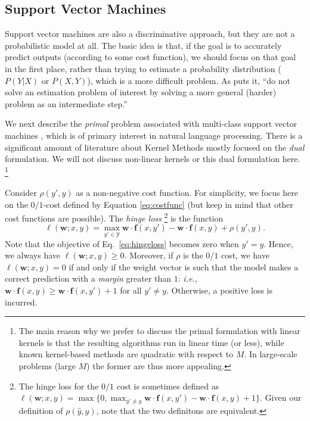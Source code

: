 \subsection{Support Vector Machines}\label{sec:svms}

Support vector machines are also a discriminative approach, but they are not a probabilistic model at all. 
The basic idea is that, if the goal is to accurately predict outputs (according to some cost function), we should focus on that 
goal in the first place, rather than trying to estimate a probability distribution ($P(Y|X)$ or $P(X,Y)$), 
which is a more difficult problem. As \citet{Vapnik1995} puts it, 
``do not solve an estimation problem of interest by solving a more general (harder) problem as an intermediate step.''  

We next describe the \emph{primal} problem associated with multi-class support vector machines \citep{Crammer2002}, 
which is of primary interest in natural language processing. 
There is a significant amount of literature about Kernel Methods \citep{Schoelkopf2002,ShaweTaylor2004} mostly focused 
on the \emph{dual} formulation. We will not discuss non-linear kernels or this dual formulation here.%
\footnote{The main reason why we prefer to discuss the primal formulation with linear kernels is that 
the resulting algorithms run in linear time (or less), while known kernel-based methods are quadratic with 
respect to $M$. In large-scale problems (large $M$) the former are thus more appealing.}

Consider $\rho(y',y)$ as a non-negative cost function. For simplicity, we focus here on the $0/1$-cost defined by Equation \ref{eq:costfunc} (but keep in mind that other cost functions are possible).  
The \emph{hinge loss}%
\footnote{The hinge loss for the $0/1$ cost is sometimes defined as 
$\ell(\boldsymbol{w}; x,y) = \max\{0, \max_{y' \ne y} \boldsymbol{w} \cdot \boldsymbol{f}(x,y') - \boldsymbol{w} \cdot\boldsymbol{f}(x,y) + 1\}$.
Given our definition of $\rho(\hat{y},y)$, note that the  two definitons are equivalent.} %
 is the function
\begin{equation}\label{eq:hingeloss}
\ell(\boldsymbol{w}; x,y) = \max_{y' \in \mathcal{Y}} \boldsymbol{w} \cdot \boldsymbol{f}(x,y') - \boldsymbol{w} \cdot\boldsymbol{f}(x,y) + \rho(y',y).
\end{equation}
Note that the objective of Eq.~\ref{eq:hingeloss} becomes zero when $y'=y$. Hence, we always have $\ell(\boldsymbol{w}; x,y)\ge 0$. 
Moreover, if $\rho$ is the $0/1$ cost, we have $\ell(\boldsymbol{w}; x,y)= 0$ if and only if the weight vector is such that the model makes a correct prediction 
with a \emph{margin} greater than $1$: \emph{i.e.}, $\boldsymbol{w} \cdot \boldsymbol{f}(x,y) \ge \boldsymbol{w} \cdot\boldsymbol{f}(x,y') + 1$ for all $y' \ne y$. 
Otherwise, a positive loss is incurred. 

